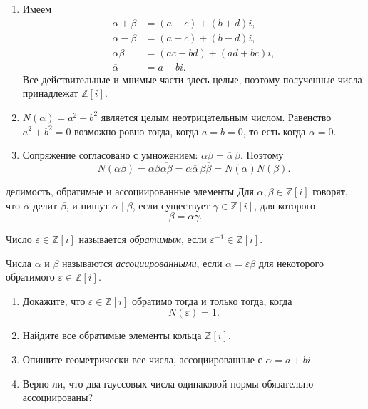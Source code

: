 \begin{enumerate}[label=\textbf{\alph*)}, leftmargin=8mm]
    \item Имеем
    \[
    \begin{aligned}
        \alpha+\beta&=(a+c)+(b+d)i,\\
        \alpha-\beta&=(a-c)+(b-d)i,\\
        \alpha\beta&=(ac-bd)+(ad+bc)i,\\
        \overline\alpha&=a-bi.
    \end{aligned}
    \]
    Все действительные и мнимые части здесь целые, поэтому полученные
    числа принадлежат $\mathbb Z[i]$.

    \item $N(\alpha)=a^2+b^2$ является целым неотрицательным числом.
    Равенство $a^2+b^2=0$ возможно ровно тогда, когда $a=b=0$, то есть
    когда $\alpha=0$.

    \item Сопряжение согласовано с умножением:
    $\overline{\alpha\beta}=\overline\alpha\,\overline\beta$. Поэтому
    \[
        N(\alpha\beta)
        =\alpha\beta\overline{\alpha\beta}
        =\alpha\overline\alpha\,\beta\overline\beta
        =N(\alpha)N(\beta).
    \]
\end{enumerate}

\medskip

\begin{defbox}{делимость, обратимые и ассоциированные элементы}
Для $\alpha,\beta\in\mathbb Z[i]$ говорят, что $\alpha$ делит $\beta$,
и пишут $\alpha\mid\beta$, если существует $\gamma\in\mathbb Z[i]$,
для которого
\[
    \beta=\alpha\gamma.
\]

Число $\varepsilon\in\mathbb Z[i]$ называется \emph{обратимым}, если
$\varepsilon^{-1}\in\mathbb Z[i]$.

Числа $\alpha$ и $\beta$ называются \emph{ассоциированными}, если
$\alpha=\varepsilon\beta$ для некоторого обратимого
$\varepsilon\in\mathbb Z[i]$.
\end{defbox}


\begin{enumerate}[label=\textbf{\alph*)}, leftmargin=8mm]
    \item Докажите, что $\varepsilon\in\mathbb Z[i]$ обратимо тогда
    и только тогда, когда
    \[
        N(\varepsilon)=1.
    \]

    \item Найдите все обратимые элементы кольца $\mathbb Z[i]$.

    \item Опишите геометрически все числа, ассоциированные с
    $\alpha=a+bi$.

    \item Верно ли, что два гауссовых числа одинаковой нормы обязательно
    ассоциированы?
\end{enumerate}

